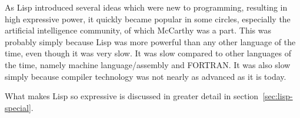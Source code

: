 \documentclass[a4paper,10pt,twoside]{report}
\begin{document}
As Lisp introduced several ideas which were new to programming, resulting in
high expressive power, it quickly became popular in some circles, especially the
artificial intelligence community, of which McCarthy was a part.  This was
probably simply because Lisp was more powerful than any other language of the
time, even though it was very slow.  It was slow compared to other languages of
the time, namely machine language/assembly and FORTRAN.  It was also slow simply
because compiler technology was not nearly as advanced as it is today.

What makes Lisp so expressive is discussed in greater detail in
section~\ref{sec:lisp-special}.

\begin{comment}
  Paul Graham nicely listed 9 particularly important ideas: \cite{pg-lisp-diff}

  \begin{description}
  \item [Conditionals] A conditional is an if-then-else construct. We take these
    for granted now. They were invented by McCarthy in the course of developing
    Lisp. (Fortran at that time only had a conditional goto, closely based on
    the branch instruction in the underlying hardware.) McCarthy, who was on the
    Algol committee, got conditionals into Algol, whence they spread to most
    other languages.
  \item[A function type] In Lisp, functions are first class objects-- they're a
    data type just like integers, strings, etc, and have a literal
    representation, can be stored in variables, can be passed as arguments, and
    so on.
  \item[Recursion] Recursion existed as a mathematical concept before Lisp of
    course, but Lisp was the first programming language to support it. (It's
    arguably implicit in making functions first class objects.)
  \item[A new concept of variables] In Lisp, all variables are effectively
    pointers. Values are what have types, not variables, and assigning or
    binding variables means copying pointers, not what they point to.
  \item[Garbage Collection]
  \item[Programs composed of expressions] Lisp programs are trees of
    expressions, each of which returns a value. (In some Lisps expressions can
    return multiple values.) This is in contrast to Fortran and most succeeding
    languages, which distinguish between expressions and statements.


\end{comment}
\end{document}
